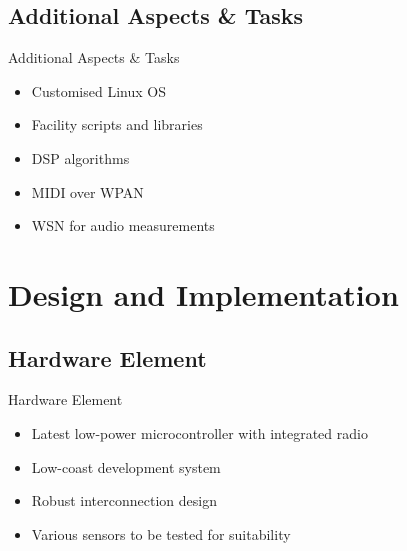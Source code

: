 \documentclass{beamer}
\begin{document}
\subsection{Additional Aspects \& Tasks}
\begin{frame}{Additional Aspects \& Tasks}

\begin{itemize}
	
	\item Customised Linux OS

	\item Facility scripts and libraries

	\item DSP algorithms

	\item MIDI over WPAN

	\item WSN for audio measurements

\end{itemize}
\end{frame}

\section{Design and Implementation}

\subsection{Hardware Element} 
\begin{frame}{Hardware Element}

\begin{itemize}

	\item Latest low-power microcontroller with integrated radio

	\item Low-coast development system

	\item Robust interconnection design

	\item Various sensors to be tested for suitability

\end{itemize}
\end{frame}
\end{document}
